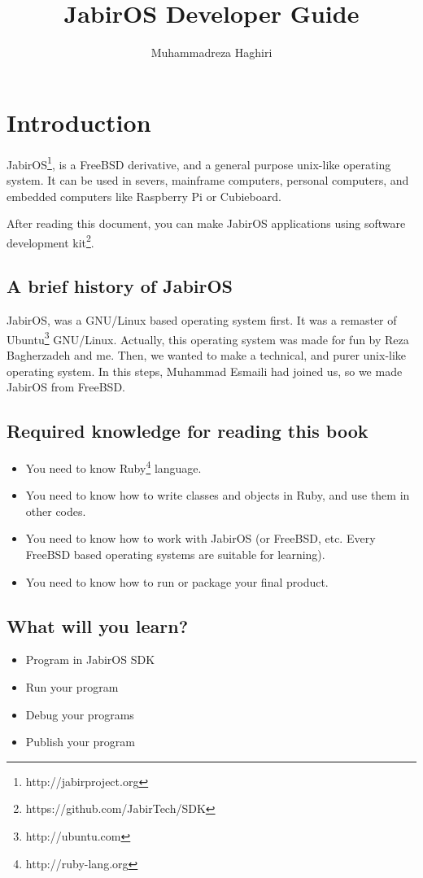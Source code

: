 \documentclass[11pt]{article}
\title{JabirOS Developer Guide}
\author{Muhammadreza Haghiri}
\begin{document}
\maketitle
\newpage{}
\tableofcontents
\newpage{}
\section{Introduction}
JabirOS\footnote{http://jabirproject.org}, is a FreeBSD derivative, and a general purpose unix-like operating system. It can be used in severs, mainframe computers, personal computers, and embedded computers like Raspberry Pi or Cubieboard.

After reading this document, you can make JabirOS applications using software development kit\footnote{https://github.com/JabirTech/SDK}. 

\subsection{A brief history of JabirOS}
JabirOS, was a GNU/Linux based operating system first. It was a remaster of Ubuntu\footnote{http://ubuntu.com} GNU/Linux. Actually, this operating system was made for fun by Reza Bagherzadeh and me. Then, we wanted to make a technical, and purer unix-like operating system. In this steps, Muhammad Esmaili had joined us, so we made JabirOS from FreeBSD. 

\subsection{Required knowledge for reading this book}
\begin{itemize}
\item You need to know Ruby\footnote{http://ruby-lang.org} language.
\item You need to know how to write classes and objects in Ruby, and use them in other codes. 
\item You need to know how to work with JabirOS (or FreeBSD, etc. Every FreeBSD based operating systems are suitable for learning). 
\item You need to know how to run or package your final product. 
\end{itemize}
\subsection{What will you learn?}
\begin{itemize}
\item Program in JabirOS SDK
\item Run your program
\item Debug your programs
\item Publish your program
\end{itemize}
\newpage{}
\end{document}
